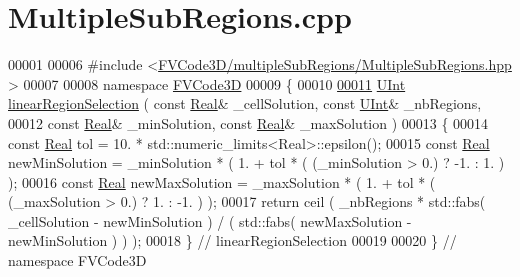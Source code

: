 \hypertarget{MultipleSubRegions_8cpp_source}{}\section{Multiple\+Sub\+Regions.\+cpp}
\label{MultipleSubRegions_8cpp_source}

\begin{DoxyCode}
00001 
00006 \textcolor{preprocessor}{#include <\hyperlink{MultipleSubRegions_8hpp}{FVCode3D/multipleSubRegions/MultipleSubRegions.hpp}
      >}
00007 
00008 \textcolor{keyword}{namespace }\hyperlink{namespaceFVCode3D}{FVCode3D}
00009 \{
00010 
\hypertarget{MultipleSubRegions_8cpp_source.tex_l00011}{}\hyperlink{namespaceFVCode3D_ae0b3b38fc8dff58445ba3d625deae285}{00011} \hyperlink{namespaceFVCode3D_a4bf7e328c75d0fd504050d040ebe9eda}{UInt} \hyperlink{namespaceFVCode3D_ae0b3b38fc8dff58445ba3d625deae285}{linearRegionSelection} ( \textcolor{keyword}{const} \hyperlink{namespaceFVCode3D_a40c1f5588a248569d80aa5f867080e83}{Real}& \_cellSolution, \textcolor{keyword}{const} 
      \hyperlink{namespaceFVCode3D_a4bf7e328c75d0fd504050d040ebe9eda}{UInt}& \_nbRegions,
00012                              \textcolor{keyword}{const} \hyperlink{namespaceFVCode3D_a40c1f5588a248569d80aa5f867080e83}{Real}& \_minSolution, \textcolor{keyword}{const} \hyperlink{namespaceFVCode3D_a40c1f5588a248569d80aa5f867080e83}{Real}& \_maxSolution )
00013 \{
00014     \textcolor{keyword}{const} \hyperlink{namespaceFVCode3D_a40c1f5588a248569d80aa5f867080e83}{Real} tol = 10. * std::numeric\_limits<Real>::epsilon();
00015     \textcolor{keyword}{const} \hyperlink{namespaceFVCode3D_a40c1f5588a248569d80aa5f867080e83}{Real} newMinSolution = \_minSolution * ( 1. + tol * ( (\_minSolution > 0.) ? -1. :  1. ) );
00016     \textcolor{keyword}{const} \hyperlink{namespaceFVCode3D_a40c1f5588a248569d80aa5f867080e83}{Real} newMaxSolution = \_maxSolution * ( 1. + tol * ( (\_maxSolution > 0.) ?  1. : -1. ) );
00017     \textcolor{keywordflow}{return} ceil ( \_nbRegions * std::fabs( \_cellSolution - newMinSolution  ) / ( std::fabs( newMaxSolution -
       newMinSolution ) ) );
00018 \} \textcolor{comment}{// linearRegionSelection}
00019 
00020 \} \textcolor{comment}{// namespace FVCode3D}
\end{DoxyCode}
